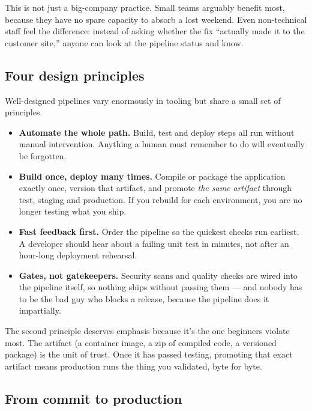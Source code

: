 This is not just a big-company practice. Small teams arguably benefit most, because they have no spare capacity to absorb a lost weekend. Even non-technical staff feel the difference: instead of asking whether the fix ``actually made it to the customer site,'' anyone can look at the pipeline status and know.



\subsection{Four design principles}


Well-designed pipelines vary enormously in tooling but share a small set of principles.


\begin{itemize}[leftmargin=*]
\item \textbf{Automate the whole path.} Build, test and deploy steps all run without manual intervention. Anything a human must remember to do will eventually be forgotten.
\item \textbf{Build once, deploy many times.} Compile or package the application exactly once, version that artifact, and promote \emph{the same artifact} through test, staging and production. If you rebuild for each environment, you are no longer testing what you ship.
\item \textbf{Fast feedback first.} Order the pipeline so the quickest checks run earliest. A developer should hear about a failing unit test in minutes, not after an hour-long deployment rehearsal.
\item \textbf{Gates, not gatekeepers.} Security scans and quality checks are wired into the pipeline itself, so nothing ships without passing them — and nobody has to be the bad guy who blocks a release, because the pipeline does it impartially.
\end{itemize}

The second principle deserves emphasis because it's the one beginners violate most. The artifact (a container image, a zip of compiled code, a versioned package) is the unit of trust. Once it has passed testing, promoting that exact artifact means production runs the thing you validated, byte for byte.



\subsection{From commit to production}


